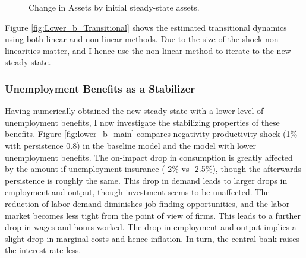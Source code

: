 \begin{figure}[H]
\caption[Caption for LOF]{Change in Assets by initial steady-state assets.}
\label{fig:lower_b_dA}
\end{figure}

Figure \ref{fig:Lower_b_Transitional} shows the estimated transitional dynamics using both linear and non-linear methods. Due to the size of the shock non-linearities matter, and I hence use the non-linear method to iterate to the new steady state. 


\subsubsection{Unemployment Benefits as a Stabilizer}
Having numerically obtained the new steady state with a lower level of unemployment benefits, I now investigate the stabilizing properties of these benefits. Figure \ref{fig:lower_b_main} compares negativity productivity shock (1\% with persistence 0.8) in the baseline model and the model with lower unemployment benefits.
The on-impact drop in consumption is greatly affected by the amount if unemployment insurance (-2\% vs -2.5\%), though the afterwards persistence is roughly the same. This drop in demand leads to larger drops in employment and output, though investment seems to be unaffected. The reduction of labor demand diminishes job-finding opportunities, and the labor market becomes less tight from the point of view of firms. This leads to a further drop in wages and hours worked. The drop in employment and output implies a slight drop in marginal costs and hence inflation. In turn, the central bank raises the interest rate less. 

